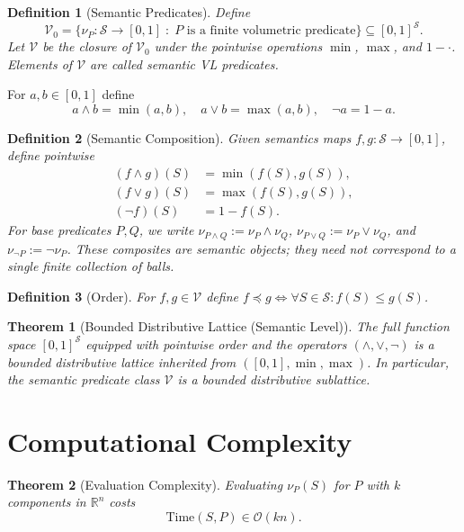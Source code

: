 \documentclass[11pt]{article}
\newtheorem{definition}{Definition}
\newtheorem{theorem}{Theorem}
\begin{document}
\begin{definition}[Semantic Predicates]
Define
\[
\mathcal{V}_0=\{\nu_P:\mathcal{S}\to[0,1]\;:\;P \text{ is a finite volumetric predicate}\}\subseteq [0,1]^{\mathcal{S}}.
\]
Let $\mathcal{V}$ be the closure of $\mathcal{V}_0$ under the pointwise operations $\min$, $\max$, and $1-\cdot$. Elements of $\mathcal{V}$ are called \emph{semantic VL predicates}.
\end{definition}

For $a,b\in[0,1]$ define
\begin{equation}
a\wedge b=\min(a,b),\quad a\vee b=\max(a,b),\quad \neg a=1-a.
\end{equation}

\begin{definition}[Semantic Composition]
Given semantics maps $f,g:\mathcal{S}\to[0,1]$, define pointwise
\begin{align}
(f\wedge g)(S)&=\min(f(S),g(S)),\\
(f\vee g)(S)&=\max(f(S),g(S)),\\
(\neg f)(S)&=1-f(S).
\end{align}
For base predicates $P,Q$, we write $\nu_{P\wedge Q}:=\nu_P\wedge\nu_Q$, $\nu_{P\vee Q}:=\nu_P\vee\nu_Q$, and $\nu_{\neg P}:=\neg\nu_P$. These composites are \emph{semantic objects}; they need not correspond to a single finite collection of balls.
\end{definition}

\begin{definition}[Order]
For $f,g\in\mathcal{V}$ define $f\preceq g \iff \forall S\in\mathcal{S}: f(S)\le g(S)$.
\end{definition}

\begin{theorem}[Bounded Distributive Lattice (Semantic Level)]
The full function space $[0,1]^{\mathcal{S}}$ equipped with pointwise order and the operators $(\wedge,\vee,\neg)$ is a bounded distributive lattice inherited from $([0,1],\min,\max)$. In particular, the semantic predicate class $\mathcal{V}$ is a bounded distributive \emph{sublattice}.
\end{theorem}

\section{Computational Complexity}

\begin{theorem}[Evaluation Complexity]
Evaluating $\nu_P(S)$ for $P$ with $k$ components in $\mathbb{R}^n$ costs
\begin{equation}
\mathrm{Time}(S,P)\in \mathcal{O}(kn).
\end{equation}
\end{theorem}
\end{document}
